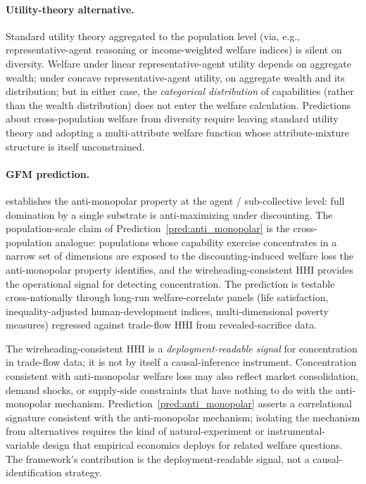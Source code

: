 \paragraph{Utility-theory alternative.}
Standard utility theory aggregated to the population level (via,
e.g., representative-agent reasoning or income-weighted welfare
indices) is silent on diversity.  Welfare under linear
representative-agent utility depends on aggregate wealth; under
concave representative-agent utility, on aggregate wealth and its
distribution; but in either case, the \emph{categorical
distribution} of capabilities (rather than the wealth
distribution) does not enter the welfare calculation.  Predictions
about cross-population welfare from diversity require leaving
standard utility theory and adopting a multi-attribute welfare
function whose attribute-mixture structure is itself unconstrained.

\paragraph{GFM prediction.}
\citep[Proposition~6]{lasser2026horizon} establishes the
anti-monopolar property at the agent / sub-collective level: full
domination by a single substrate is anti-maximizing under
discounting.  The population-scale claim of
Prediction~\ref{pred:anti_monopolar} is the cross-population
analogue: populations whose capability exercise concentrates in a
narrow set of dimensions are exposed to the discounting-induced
welfare loss the anti-monopolar property identifies, and the
wireheading-consistent HHI provides the operational signal for
detecting concentration.  The prediction is testable cross-nationally
through long-run welfare-correlate panels (life satisfaction,
inequality-adjusted human-development indices, multi-dimensional
poverty measures) regressed against trade-flow HHI from
revealed-sacrifice data.

\begin{remark}
\label{rem:hhi_consistent_with}
The wireheading-consistent HHI is a \emph{deployment-readable
signal} for concentration in trade-flow data; it is not by itself
a causal-inference instrument.  Concentration consistent with
anti-monopolar welfare loss may also reflect market consolidation,
demand shocks, or supply-side constraints that have nothing to do
with the anti-monopolar mechanism.  Prediction~\ref{pred:anti_monopolar}
asserts a correlational signature consistent with the
anti-monopolar mechanism; isolating the mechanism from
alternatives requires the kind of natural-experiment or instrumental-
variable design that empirical economics deploys for related
welfare questions.  The framework's contribution is the
deployment-readable signal, not a causal-identification strategy.
\end{remark}

